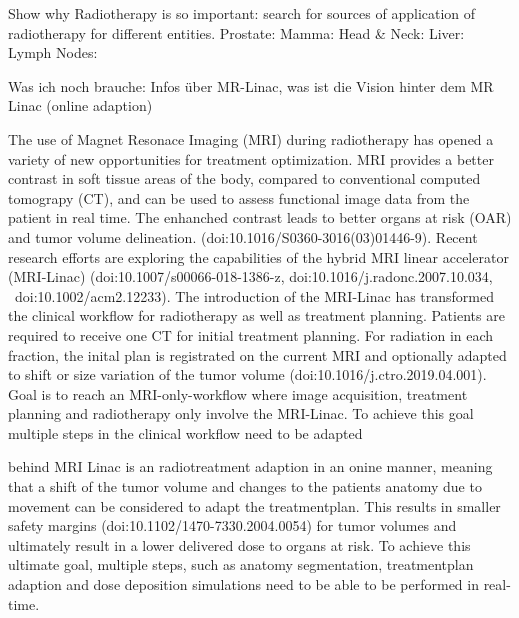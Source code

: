 Show why Radiotherapy is so important: search for sources of application of radiotherapy for different entities. Prostate: \cite{geinitz_3d_2005, nguyen_curative_2005, budiharto_external_nodate} Mamma: \cite{ragaz_adjuvant_1997, lena_combined_nodate, taylor_estimating_2017} Head \& Neck: \cite{datta_head_1990, bhide_advances_2010, castadot_adaptive_2010, morgan_adaptive_2020} Liver: \cite{hoyer_radiotherapy_2012, wulf_stereotactic_2001, wulf_stereotactic_2006, sterzing_stereotactic_2014, witt_mri-guided_2020} Lymph Nodes: \cite{degro_degro_2014, matsushita_stereotactic_2018, mikell_postoperative_2015, lundstedt_long-term_2012, jereczek-fossa_is_2015}

Was ich noch brauche: Infos über MR-Linac, was ist die Vision hinter dem MR Linac (online adaption) 

The use of Magnet Resonace Imaging (MRI) during radiotherapy has opened a variety of new opportunities for treatment optimization. MRI provides a better contrast in soft tissue areas of the body, compared to conventional computed tomograpy (CT), and can be used to assess functional image data from the patient in real time. The enhanched contrast leads to better organs at risk (OAR) and tumor volume delineation. (doi:10.1016/S0360-3016(03)01446-9). Recent research efforts are exploring the capabilities of the hybrid MRI linear accelerator (MRI-Linac) (doi:10.1007/s00066-018-1386-z, doi:10.1016/j.radonc.2007.10.034,  doi:10.1002/acm2.12233). The introduction of the MRI-Linac has transformed the clinical workflow for radiotherapy as well as treatment planning. Patients are required to receive one CT for initial treatment planning. For radiation in each fraction, the inital plan is registrated on the current MRI and optionally adapted to shift or size variation of the tumor volume (doi:10.1016/j.ctro.2019.04.001). Goal is to reach an MRI-only-workflow where image acquisition, treatment planning and radiotherapy only involve the MRI-Linac. To achieve this goal multiple steps in the clinical workflow need to be adapted

behind MRI Linac is an radiotreatment adaption in an onine manner, meaning that a shift of the tumor volume and changes to the patients anatomy due to movement can be considered to adapt the treatmentplan. This results in smaller safety margins (doi:10.1102/1470-7330.2004.0054) for tumor volumes and ultimately result in a lower delivered dose to organs at risk. To achieve this ultimate goal, multiple steps, such as anatomy segmentation, treatmentplan adaption and dose deposition simulations need to be able to be performed in real-time. 

